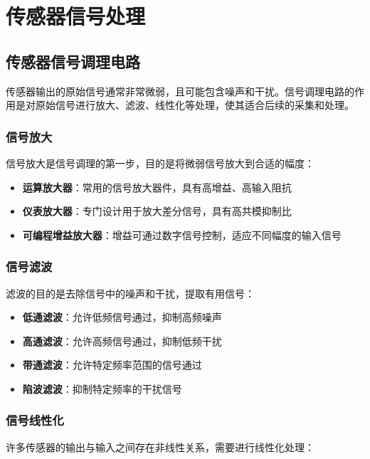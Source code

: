 \documentclass[12pt,UTF8]{ctexbook}
\begin{document}
\chapter{传感器信号处理}

\section{传感器信号调理电路}

传感器输出的原始信号通常非常微弱，且可能包含噪声和干扰。信号调理电路的作用是对原始信号进行放大、滤波、线性化等处理，使其适合后续的采集和处理。

\subsection{信号放大}

信号放大是信号调理的第一步，目的是将微弱信号放大到合适的幅度：

\begin{itemize}[leftmargin=2cm]
	\item \textbf{运算放大器}：常用的信号放大器件，具有高增益、高输入阻抗
	\item \textbf{仪表放大器}：专门设计用于放大差分信号，具有高共模抑制比
	\item \textbf{可编程增益放大器}：增益可通过数字信号控制，适应不同幅度的输入信号
\end{itemize}

\subsection{信号滤波}

滤波的目的是去除信号中的噪声和干扰，提取有用信号：

\begin{itemize}[leftmargin=2cm]
	\item \textbf{低通滤波}：允许低频信号通过，抑制高频噪声
	\item \textbf{高通滤波}：允许高频信号通过，抑制低频干扰
	\item \textbf{带通滤波}：允许特定频率范围的信号通过
	\item \textbf{陷波滤波}：抑制特定频率的干扰信号
\end{itemize}

\subsection{信号线性化}

许多传感器的输出与输入之间存在非线性关系，需要进行线性化处理：
\end{document}
